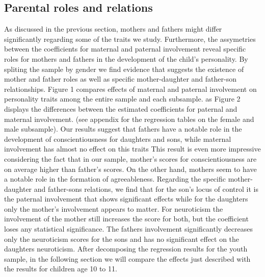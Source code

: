 \documentclass[%
    a4paper,            %
    11pt,               %
    bibliography=totoc, %
]
{scrartcl}
\begin{document}
\subsection{Parental roles and relations}
As discussed in the previous section, mothers and fathers might differ significantly regarding some of the traits we study. Furthermore, the assymetries between the coefficients for maternal and paternal involvement reveal specific roles for mothers and fathers in the development of the child's personality. By spliting the sample by gender we find evidence that suggests the existence of mother and father roles as well as specific mother-daughter and father-son relationships. Figure 1 compares effects of maternal and paternal involvement on personality traits among the entire sample and each subsample.  as Figure 2 displays the differences between the estimated coefficients for paternal and maternal involvement. (see appendix for the regression tables on the female and male subsample). Our results suggest that fathers have a notable role in the development of conscientiousness for daughters and sons, while maternal involvement has almost no effect on this traits This result is even more impressive considering the fact that in our sample, mother's scores for conscientiousness are on average higher than father's scores. On the other hand, mothers seem to have a notable role in the formation of agreeableness. \newline
Regarding the specific mother-daughter and father-sons relations, we find that for the son's locus of control it is the paternal involvement that shows significant effects while for the daughters only the mother's involvement appears to matter. For neuroticism the involvement of the mother still increases the score for both, but the coefficient loses any statistical significance. The fathers involvement  significantly decreases only the neuroticism scores for the sons and has no significant effect on the daughters neuroticism.\newline
After decomposing the regression results for the youth sample, in the following section we will compare the effects just described with the results for children age 10 to 11.
\end{document}
